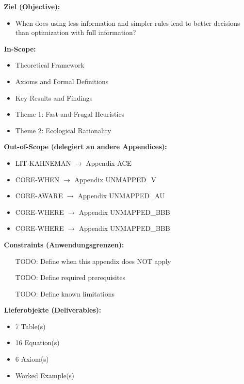 \begin{tcolorbox}[
    colback=orange!5!white,
    colframe=orange!75!black,
    title={\textbf{Appendix Scope: Ziel / In-Scope / Out-of-Scope / Constraints}},
    fonttitle=\bfseries
]

\textbf{Ziel (Objective):}
\begin{itemize}[nosep]
    \item When does using less information and simpler rules lead to better decisions than optimization with full information?
\end{itemize}

\textbf{In-Scope:}
\begin{itemize}[nosep]
    \item Theoretical Framework
    \item Axioms and Formal Definitions
    \item Key Results and Findings
    \item Theme 1: Fast-and-Frugal Heuristics
    \item Theme 2: Ecological Rationality
\end{itemize}

\textbf{Out-of-Scope (delegiert an andere Appendices):}
\begin{itemize}[nosep]
    \item LIT-KAHNEMAN $\rightarrow$ Appendix ACE
    \item CORE-WHEN $\rightarrow$ Appendix UNMAPPED_V
    \item CORE-AWARE $\rightarrow$ Appendix UNMAPPED_AU
    \item CORE-WHERE $\rightarrow$ Appendix UNMAPPED_BBB
    \item CORE-WHERE $\rightarrow$ Appendix UNMAPPED_BBB
\end{itemize}

\textbf{Constraints (Anwendungsgrenzen):}
\begin{itemize}[nosep]
    \item [TODO: Define when this appendix does NOT apply]
    \item [TODO: Define required prerequisites]
    \item [TODO: Define known limitations]
\end{itemize}

\textbf{Lieferobjekte (Deliverables):}
\begin{itemize}[nosep]
    \item 7 Table(s)
    \item 16 Equation(s)
    \item 6 Axiom(s)
    \item Worked Example(s)
\end{itemize}

\end{tcolorbox}




